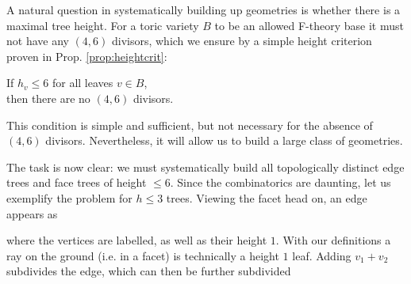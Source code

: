 \documentclass[aps,prl,twocolumn, superscriptaddress,groupedaddress,nofootinbib]{revtex4}
\begin{document}
A natural question
in systematically building up geometries is whether there is
a maximal tree height. For a toric variety $B$ to be an allowed
F-theory base it must not have any $(4,6)$ divisors, which
we ensure by a simple height criterion proven in Prop. \ref{prop:heightcrit}:
\begin{center}
If $h_v\leq 6$ for all leaves $v\in B$, \\ then there are no $(4,6)$
divisors.
\end{center}
This condition is simple and sufficient, but not necessary
for the absence of $(4,6)$ divisors. Nevertheless, it
will allow us to build a large class of geometries.


\vspace{.5cm}
The task is now clear: we must systematically build  all
topologically distinct edge trees and face trees of height 
$\leq 6$. Since the combinatorics are daunting, let us
exemplify the problem for $h\leq 3$ trees. Viewing the
facet head on, an edge appears as 
\begin{center}
\end{center}
where the vertices are labelled, as well as their height $1$.
With our definitions a ray on the ground (i.e. in a facet)
is technically a height $1$ leaf. Adding $v_1+v_2$ subdivides the
edge, which can then be further subdivided
\end{document}
